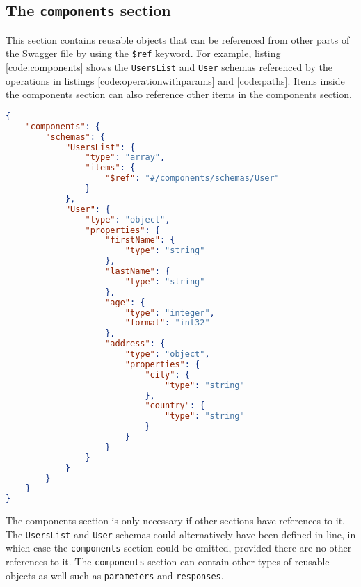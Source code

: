 \subsection{The \texttt{components} section}
This section contains reusable objects that can be referenced from other parts of the Swagger file by using the \texttt{\$ref} keyword. For example, listing \ref{code:components} shows the \texttt{UsersList} and \texttt{User} schemas referenced by the operations in listings \ref{code:operationwithparams} and \ref{code:paths}. Items inside the components section can also reference other items in the components section.\\
\begin{minipage}{\textwidth}
\begin{lstlisting}[caption={Components section with schemas},label={code:components},language=json]
{
    "components": {
        "schemas": {
            "UsersList": {
                "type": "array",
                "items": {
                    "$ref": "#/components/schemas/User"
                }
            },
            "User": {
                "type": "object",
                "properties": {
                    "firstName": {
                        "type": "string"
                    },
                    "lastName": {
                        "type": "string"
                    },
                    "age": {
                        "type": "integer",
                        "format": "int32"
                    },
                    "address": {
                        "type": "object",
                        "properties": {
                            "city": {
                                "type": "string"
                            },
                            "country": {
                                "type": "string"
                            }
                        }
                    }
                }
            }
        }
    }
}
\end{lstlisting}
\end{minipage}
The components section is only necessary if other sections have references to it. The \texttt{UsersList} and \texttt{User} schemas could alternatively have been defined in-line, in which case the \texttt{components} section could be omitted, provided there are no other references to it. The \texttt{components} section can contain other types of reusable objects as well such as \texttt{parameters} and \texttt{responses}.

